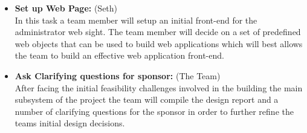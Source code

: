 \documentclass[Letter,11pt]{article}
\begin{document}
\begin{itemize}
			\item\textbf{Set up Web Page:} (Seth)\\
			In this task a team member will setup an initial front-end for the administrator web sight. The team member will decide on a set of predefined web objects that can be used to build web applications which will best allows the team to build an effective web application front-end. 
			
			\item\textbf{Ask Clarifying questions for sponsor:} (The Team)\\
			After facing the initial feasibility challenges involved in the building the main subsystem of the project the team will compile the design report and a number of clarifying questions for the sponsor in order to further refine the teams initial design decisions. 
		\end{itemize}
		
		
		
\end{document}
